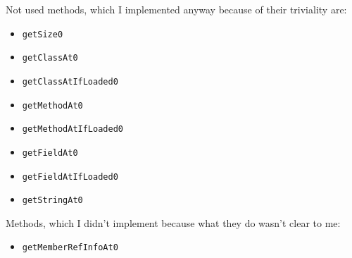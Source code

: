 \documentclass[a4paper, 10pt, titlepage]{scrartcl} %
\begin{document}
Not used methods, which I implemented anyway because of their triviality are:
\begin{itemize}
 \item \begin{scriptsize}\verb|getSize0|\end{scriptsize}
 \item \begin{scriptsize}\verb|getClassAt0|\end{scriptsize}
 \item \begin{scriptsize}\verb|getClassAtIfLoaded0|\end{scriptsize}
 \item \begin{scriptsize}\verb|getMethodAt0|\end{scriptsize}
 \item \begin{scriptsize}\verb|getMethodAtIfLoaded0|\end{scriptsize}
 \item \begin{scriptsize}\verb|getFieldAt0|\end{scriptsize}
 \item \begin{scriptsize}\verb|getFieldAtIfLoaded0|\end{scriptsize}
 \item \begin{scriptsize}\verb|getStringAt0|\end{scriptsize}
\end{itemize}

Methods, which I didn't implement because what they do wasn't clear to me:
\begin{itemize}
 \item \begin{scriptsize}\verb|getMemberRefInfoAt0|\end{scriptsize}
\end{itemize}
\end{document}
